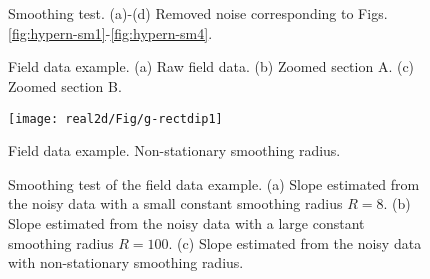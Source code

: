 \begin{figure}[htb!]
\centering
{}
   \\
   \\
\caption{Smoothing test. (a)-(d) Removed noise corresponding to Figs. \ref{fig:hypern-sm1}-\ref{fig:hypern-sm4}.}
\label{fig:hypern-sm1-n,hypern-sm2-n,hypern-sm3-n,hypern-sm4-n}
\end{figure}



\begin{figure}[htb!]
\centering
{}
\caption{Field data example. (a) Raw field data. (b) Zoomed section A. (c) Zoomed section B.}
\label{fig:g-0,g-z-a,g-z-b}
\end{figure}

\begin{figure}[htb!]
\centering
\texttt{[image: real2d/Fig/g-rectdip1]}
\caption{Field data example. Non-stationary smoothing radius.}
\label{fig:g-rectdip1}
\end{figure}
   

\begin{figure}[htb!]
\centering
{}
\caption{Smoothing test of the field data example. (a) Slope estimated from the noisy data with a small constant smoothing radius $R=8$. (b) Slope estimated from the noisy data with a large constant smoothing radius $R=100$. (c) Slope estimated from the noisy data with non-stationary smoothing radius.}
\label{fig:g-dip1,g-dip2,g-dip3}
\end{figure}


